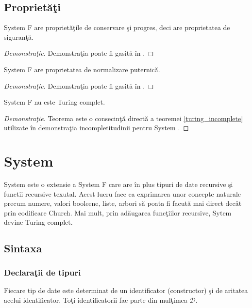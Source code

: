 \subsection{Propriet\u a\c ti}
\begin{theorem}[Siguranta]
System F are propriet\u a\c tile de conservare \c si progres, deci are proprietatea de siguran\c t\u a.
\end{theorem}
\begin{proof}[Demonstra\c tie]
Demonstra\c tia poate fi gasit\u a \^ in \citep{Pierce:TypeSystems}.
\end{proof}
\begin{theorem}
System F are proprietatea de normalizare puternic\u a.
\end{theorem}
\begin{proof}[Demonstra\c tie]
Demonstra\c tia poate fi gasit\u a \^in \citep{64805}.
\end{proof}

\begin{corollary}
System F nu este Turing complet.
\end{corollary}
\begin{proof}[Demonstra\c tie]
Teorema este o consecin\c t\u a direct\u a a teoremei \ref{turing_incomplete} utilizate \^ in demonstra\c tia incompletitudinii pentru System \fhat.
\end{proof}

\section[System F rec]{System \frec}

System \frec \citep{1614481} este o extensie a System F care are \^ in plus tipuri de date recursive \c si functii recursive texutal. Acest lucru face ca exprimarea unor concepte naturale precum numere, valori booleene, liste, arbori s\u a poata fi facut\u a mai direct dec\^ at prin codificare Church. Mai mult, prin ad\u augarea func\c tiilor recursive, Sytem \frec devine Turing complet.

\subsection{Sintaxa}

\subsubsection{Declara\c tii de tipuri}
Fiecare tip de date este determinat de un identificator (constructor) \c si de aritatea acelui identificator. To\c ti identificatorii fac parte din mul\c timea $\mathcal{D}$.

